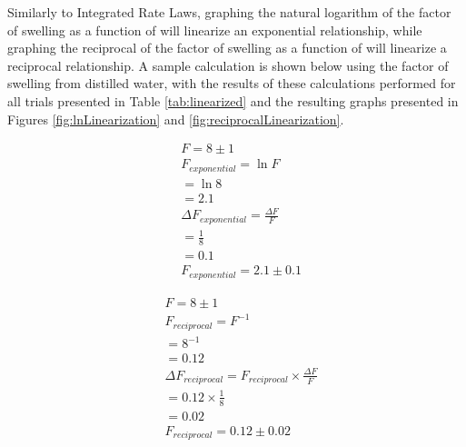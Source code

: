 \documentclass[11pt, letterpaper]{article}
\begin{document}
Similarly to Integrated Rate Laws, graphing the natural logarithm of the factor of swelling as a function
of \ce{[H+]} will linearize an exponential relationship, while
graphing the reciprocal of the factor of swelling as a function
of \ce{[H+]} will linearize a reciprocal relationship.
A sample calculation is shown below using the factor of swelling from distilled water, with the results
of these calculations performed for all trials presented
in Table \ref*{tab:linearized} and the resulting graphs presented in Figures \ref*{fig:lnLinearization} and \ref*{fig:reciprocalLinearization}.

\begin{multicols}{2}
    \begin{align*}
         & F = 8 \pm 1
        \\
         & F_{exponential} = \ln{F}
        \\
         & = \ln{8}
        \\
         & = 2.1
        \\
         & \Delta F_{exponential} = \frac{\Delta F}{F}
        \\
         & = \frac{1}{8}
        \\
         & = 0.1
        \\
         & F_{exponential} = 2.1 \pm 0.1
    \end{align*}

    \begin{align*}
         & F = 8 \pm 1
        \\
         & F_{reciprocal} = F^{-1}
        \\
         & = 8^{-1}
        \\
         & = 0.12
        \\
         & \Delta F_{reciprocal} = F_{reciprocal} \times \frac{\Delta F}{F}
        \\
         & = 0.12 \times \frac{1}{8}
        \\
         & = 0.02
        \\
         & F_{reciprocal} = 0.12 \pm 0.02
    \end{align*}
\end{multicols}
\end{document}
